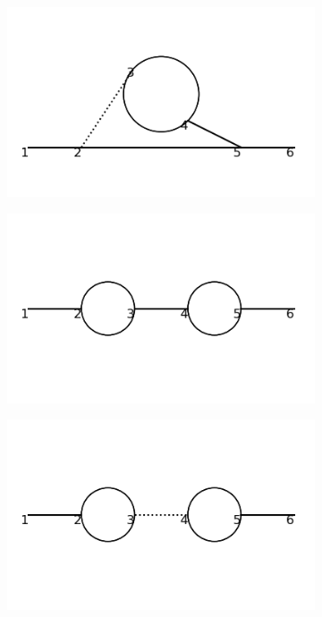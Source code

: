 \documentclass[11pt,a4paper,twoside,pdf]{article}
\numberwithin{equation}{section}
\begin{document}
\begin{figure}[h!]
\begin{subfigure}[t]{0.19\textwidth}
        \caption{ }
    \end{subfigure}
    \begin{subfigure}[t]{0.19\textwidth}
        \centering
        \includegraphics[width=\textwidth]{plots/order4_1to1/4.png}
        \caption{ }
    \end{subfigure}
    \begin{subfigure}[t]{0.19\textwidth}
        \centering
        \includegraphics[width=\textwidth]{plots/order4_1to1/5.png}
        \caption{ }
    \end{subfigure}
    \begin{subfigure}[t]{0.19\textwidth}
        \centering
        \includegraphics[width=\textwidth]{plots/order4_1to1/6.png}

\end{subfigure}
\end{figure}
\end{document}
